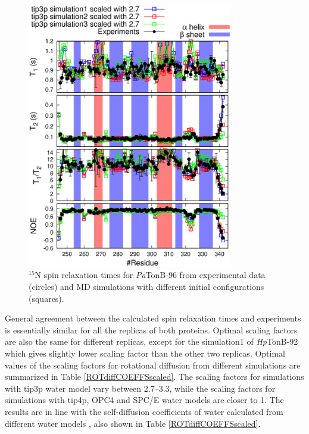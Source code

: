 \documentclass[journal=jpcbfk]{achemso}
\begin{document}
\begin{figure}[!h]
  \includegraphics[width=9cm]{../Figs/PsTonBrelaxationDATAreplicas.eps}%
  \caption{$^{15}$N spin relaxation times for {\it Pa}TonB-96 from experimental data (circles)
    and MD simulations with different initial configurations (squares). \label{PsTonBrelaxationDATAreplicas}}
\end{figure}

General agreement between the calculated spin relaxation times and experiments is essentially similar for all
the replicas of both proteins. Optimal scaling factors are also the same for different replicas, except for
the simulation1 of {\it Hp}TonB-92 which gives slightly lower scaling factor than the other two replicas.
Optimal values of the scaling factors for rotational diffusion from different simulations are summarized in
Table \ref{ROTdiffCOEFFSscaled}. The scaling factors for simulations with tip3p water model vary between 2.7--3.3, while
the scaling factors for simulations with tip4p, OPC4 and SPC/E water models are closer to 1.
The results are in line with the self-diffusion coefficients of water calculated from different water models \cite{izadi14},
also shown in Table \ref{ROTdiffCOEFFSscaled}.
\end{document}
